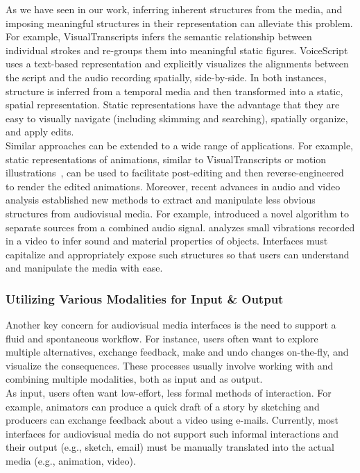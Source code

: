 As we have seen in our work, inferring inherent structures from the media, and imposing meaningful structures in their representation can alleviate this problem. For example, VisualTranscripts infers the semantic relationship between individual strokes and re-groups them into meaningful static figures. VoiceScript uses a text-based representation and explicitly visualizes the alignments between the script and the audio recording spatially, side-by-side. In both instances, structure is inferred from a temporal media and then transformed into a static, spatial representation. Static representations have the advantage that they are easy to visually navigate (including skimming and searching), spatially organize, and apply edits.\\

Similar approaches can be extended to a wide range of applications. For example, static representations of animations, similar to VisualTranscripts or motion illustrations~\cite{chi2016authoring}, can be used to facilitate post-editing and then reverse-engineered to render the edited animations. Moreover, recent advances in audio and video analysis established new methods to extract and manipulate less obvious structures from audiovisual media. For example, \cite{mysore2010non} introduced a novel algorithm to separate sources from a combined audio signal. \cite{davis2014visual} analyzes small vibrations recorded in a video to infer sound and material properties of objects. Interfaces must capitalize and appropriately expose such structures so that users can understand and manipulate the media with ease.

\subsubsection{Utilizing Various Modalities for Input \& Output}
Another key concern for audiovisual media interfaces is the need to support a fluid and spontaneous workflow. For instance, users often want to explore multiple alternatives, exchange feedback, make and undo changes on-the-fly, and visualize the consequences. These processes usually involve working with and combining multiple modalities, both as input and as output.\\ 

As input, users often want low-effort, less formal methods of interaction. For example, animators can produce a quick draft of a story by sketching and producers can exchange feedback about a video using e-mails. Currently, most interfaces for audiovisual media do not support such informal interactions and their output (e.g., sketch, email) must be manually translated into the actual media (e.g., animation, video).\\ 

